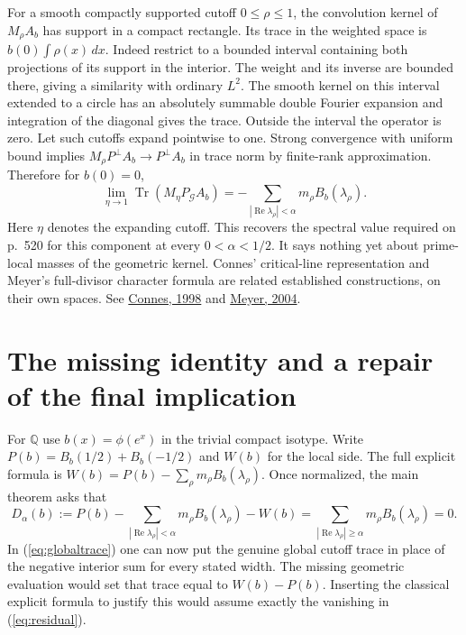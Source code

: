 \documentclass[11pt,letterpaper]{article}
\newcommand{\Q}{\mathbb Q}
\newcommand{\Gg}{\mathcal G}
\newcommand{\Tr}{\operatorname{Tr}}
\newcommand{\re}{\operatorname{Re}}
\begin{document}
For a smooth compactly supported cutoff $0\le\rho\le1$, the convolution kernel of $M_\rho A_b$ has support in a compact rectangle. Its trace in the weighted space is $b(0)\int\rho(x)\,dx$. Indeed restrict to a bounded interval containing both projections of its support in the interior. The weight and its inverse are bounded there, giving a similarity with ordinary $L^2$. The smooth kernel on this interval extended to a circle has an absolutely summable double Fourier expansion and integration of the diagonal gives the trace. Outside the interval the operator is zero. Let such cutoffs expand pointwise to one. Strong convergence with uniform bound implies $M_\rho P^\perp A_b\to P^\perp A_b$ in trace norm by finite-rank approximation. Therefore for $b(0)=0$,
\begin{equation}
 \lim_{\eta\to1}\Tr(M_\eta P_{\Gg} A_b)
   =-\sum_{|\re\lambda_\rho|<\alpha}m_\rho B_b(\lambda_\rho).
 \label{eq:globaltrace}
\end{equation}
Here $\eta$ denotes the expanding cutoff. This recovers the spectral value required on p.~520 for this component at every $0<\alpha<1/2$. It says nothing yet about prime-local masses of the geometric kernel. Connes' critical-line representation and Meyer's full-divisor character formula are related established constructions, on their own spaces. See \href{https://arxiv.org/abs/math/9811068}{Connes, 1998} and \href{https://arxiv.org/abs/math/0412277}{Meyer, 2004}.

\section{The missing identity and a repair of the final implication}\label{sec:residual}

For $\Q$ use $b(x)=\phi(e^x)$ in the trivial compact isotype. Write $P(b)=B_b(1/2)+B_b(-1/2)$ and $W(b)$ for the local side. The full explicit formula is $W(b)=P(b)-\sum_{\rho}m_\rho B_b(\lambda_\rho)$. Once normalized, the main theorem asks that
\begin{equation}
 D_\alpha(b):=P(b)-\sum_{|\re\lambda_\rho|<\alpha}m_\rho B_b(\lambda_\rho)-W(b)
     =\sum_{|\re\lambda_\rho|\ge\alpha}m_\rho B_b(\lambda_\rho)=0 .
 \label{eq:residual}
\end{equation}
In (\ref{eq:globaltrace}) one can now put the genuine global cutoff trace in place of the negative interior sum for every stated width. The missing geometric evaluation would set that trace equal to $W(b)-P(b)$. Inserting the classical explicit formula to justify this would assume exactly the vanishing in (\ref{eq:residual}).
\end{document}
